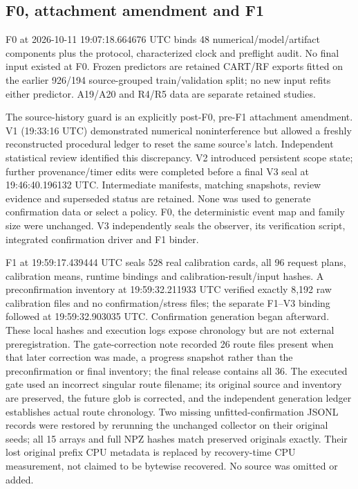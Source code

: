 \subsection{F0, attachment amendment and F1}
F0 at 2026-10-11 19:07:18.664676 UTC binds 48 numerical/model/artifact components plus the protocol, characterized clock and preflight audit. No final input existed at F0. Frozen predictors are retained CART/RF exports fitted on the earlier 926/194 source-grouped train/validation split; no new input refits either predictor. A19/A20 and R4/R5 data are separate retained studies.

The source-history guard is an explicitly post-F0, pre-F1 attachment amendment. V1 (19:33:16 UTC) demonstrated numerical noninterference but allowed a freshly reconstructed procedural ledger to reset the same source's latch. Independent statistical review identified this discrepancy. V2 introduced persistent scope state; further provenance/timer edits were completed before a final V3 seal at 19:46:40.196132 UTC. Intermediate manifests, matching snapshots, review evidence and superseded status are retained. None was used to generate confirmation data or select a policy. F0, the deterministic event map and family size were unchanged. V3 independently seals the observer, its verification script, integrated confirmation driver and F1 binder.

F1 at 19:59:17.439444 UTC seals 528 real calibration cards, all 96 request plans, calibration means, runtime bindings and calibration-result/input hashes. A preconfirmation inventory at 19:59:32.211933 UTC verified exactly 8,192 raw calibration files and no confirmation/stress files; the separate F1--V3 binding followed at 19:59:32.903035 UTC. Confirmation generation began afterward. These local hashes and execution logs expose chronology but are not external preregistration. The gate-correction note recorded 26 route files present when that later correction was made, a progress snapshot rather than the preconfirmation or final inventory; the final release contains all 36. The executed gate used an incorrect singular route filename; its original source and inventory are preserved, the future glob is corrected, and the independent generation ledger establishes actual route chronology. Two missing unfitted-confirmation JSONL records were restored by rerunning the unchanged collector on their original seeds; all 15 arrays and full NPZ hashes match preserved originals exactly. Their lost original prefix CPU metadata is replaced by recovery-time CPU measurement, not claimed to be bytewise recovered. No source was omitted or added.

